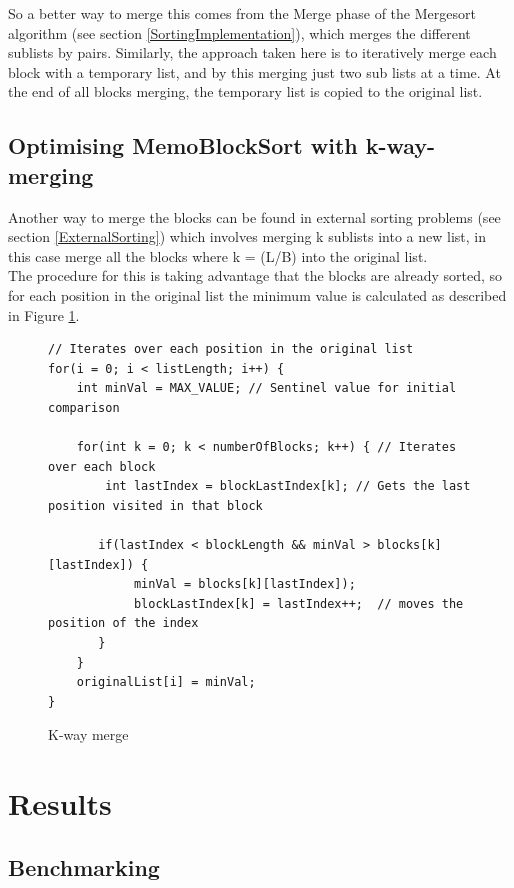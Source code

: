 \documentclass[a4paper,12pt]{article}
\begin{document}
So a better way to merge this comes from the Merge phase of the Mergesort algorithm (see section \ref{SortingImplementation}), which merges the different sublists by pairs. Similarly, the approach taken here is to iteratively merge each block with a temporary list, and by this merging just two sub lists at a time. At the end of all blocks merging, the temporary list is copied to the original list.

\subsection{Optimising MemoBlockSort with k-way-merging}
Another way to merge the blocks can be found in external sorting problems (see section \ref{ExternalSorting}) which involves merging k sublists into a new list, in this case merge all the blocks where k =  (L/B) into the original list.\\

The procedure for this is taking advantage that the blocks are already sorted, so for each position in the original list the minimum value is calculated as described in Figure \ref{kWayMerge}.

\begin{figure}[H]
\begin{small}
\begin{verbatim}
// Iterates over each position in the original list
for(i = 0; i < listLength; i++) {
    int minVal = MAX_VALUE; // Sentinel value for initial comparison

    for(int k = 0; k < numberOfBlocks; k++) { // Iterates over each block
        int lastIndex = blockLastIndex[k]; // Gets the last position visited in that block
		
       if(lastIndex < blockLength && minVal > blocks[k][lastIndex]) {
            minVal = blocks[k][lastIndex]);
            blockLastIndex[k] = lastIndex++;  // moves the position of the index
       }
    }
    originalList[i] = minVal;
}
\end{verbatim}
\end{small}
\caption{K-way merge}
\label{kWayMerge}
\end{figure}

\section{Results}

\subsection{Benchmarking}
\end{document}
